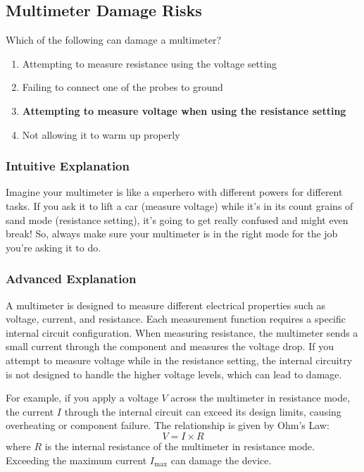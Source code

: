 \subsection{Multimeter Damage Risks}
\label{T7D06}

\begin{tcolorbox}[colback=gray!10!white,colframe=black!75!black,title=T7D06]
Which of the following can damage a multimeter?
\begin{enumerate}[label=\Alph*)]
    \item Attempting to measure resistance using the voltage setting
    \item Failing to connect one of the probes to ground
    \item \textbf{Attempting to measure voltage when using the resistance setting}
    \item Not allowing it to warm up properly
\end{enumerate}
\end{tcolorbox}

\subsubsection{Intuitive Explanation}
Imagine your multimeter is like a superhero with different powers for different tasks. If you ask it to lift a car (measure voltage) while it’s in its count grains of sand mode (resistance setting), it’s going to get really confused and might even break! So, always make sure your multimeter is in the right mode for the job you’re asking it to do.

\subsubsection{Advanced Explanation}
A multimeter is designed to measure different electrical properties such as voltage, current, and resistance. Each measurement function requires a specific internal circuit configuration. When measuring resistance, the multimeter sends a small current through the component and measures the voltage drop. If you attempt to measure voltage while in the resistance setting, the internal circuitry is not designed to handle the higher voltage levels, which can lead to damage. 

For example, if you apply a voltage \( V \) across the multimeter in resistance mode, the current \( I \) through the internal circuit can exceed its design limits, causing overheating or component failure. The relationship is given by Ohm's Law:
\[
V = I \times R
\]
where \( R \) is the internal resistance of the multimeter in resistance mode. Exceeding the maximum current \( I_{\text{max}} \) can damage the device.

